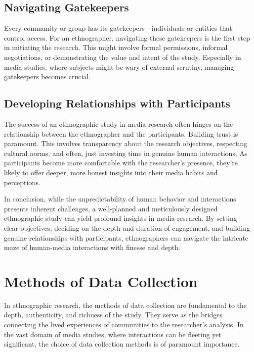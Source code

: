\documentclass[
  b5paper]{book}
\begin{document}
\hypertarget{navigating-gatekeepers}{%
\subsection*{Navigating Gatekeepers}\label{navigating-gatekeepers}}

Every community or group has its gatekeepers---individuals or entities that control access. For an ethnographer, navigating these gatekeepers is the first step in initiating the research. This might involve formal permissions, informal negotiations, or demonstrating the value and intent of the study. Especially in media studies, where subjects might be wary of external scrutiny, managing gatekeepers becomes crucial.

\hypertarget{developing-relationships-with-participants}{%
\subsection*{Developing Relationships with Participants}\label{developing-relationships-with-participants}}

The success of an ethnographic study in media research often hinges on the relationship between the ethnographer and the participants. Building trust is paramount. This involves transparency about the research objectives, respecting cultural norms, and often, just investing time in genuine human interactions. As participants become more comfortable with the researcher's presence, they're likely to offer deeper, more honest insights into their media habits and perceptions.

In conclusion, while the unpredictability of human behavior and interactions presents inherent challenges, a well-planned and meticulously designed ethnographic study can yield profound insights in media research. By setting clear objectives, deciding on the depth and duration of engagement, and building genuine relationships with participants, ethnographers can navigate the intricate maze of human-media interactions with finesse and depth.

\hypertarget{methods-of-data-collection}{%
\section{Methods of Data Collection}\label{methods-of-data-collection}}

In ethnographic research, the methods of data collection are fundamental to the depth, authenticity, and richness of the study. They serve as the bridges connecting the lived experiences of communities to the researcher's analysis. In the vast domain of media studies, where interactions can be fleeting yet significant, the choice of data collection methods is of paramount importance.
\end{document}
